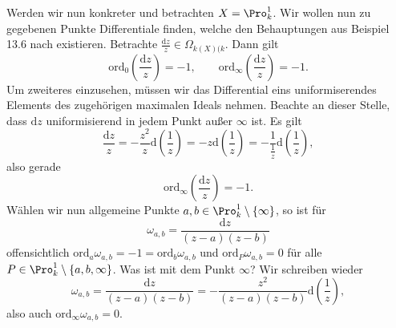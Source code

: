 \documentclass[11pt]{book}
\theoremstyle{nonumberbreak}
\newenvironment{pr}[1][]{\ifthenelse{\equal{#1}{}}{\proof}{\proof[#1]}\rm}{\endproof}
\newenvironment{ex}[1][]{\ifthenelse{\equal{#1}{}}{\example}{\example[#1]}\rm}{\endexample}
\begin{document}
\begin{spacing}{1.4}
\begin{ex}
\begin{pr}
\begin{compactenum}
\end{compactenum}
\end{pr}


\end{ex}


\begin{ex}
Werden wir nun konkreter und betrachten $X= \Pro^1_k$. Wir wollen nun zu gegebenen Punkte Differentiale finden, welche den Behauptungen aus Beispiel 13.6 nach existieren. Betrachte $\frac{\mathrm{d}z}{z} \in \Omega_{k(X)(k}$. Dann gilt 
$$\mathrm{ord}_0 \left(\frac{\mathrm{d}z}{z}\right) = -1, \qquad \mathrm{ord}_{\infty} \left(\frac{\mathrm{d}z}{z}\right) = -1.$$
Um zweiteres einzusehen, müssen wir das Differential eins uniformiserendes Elements des zugehörigen maximalen Ideals nehmen. Beachte an dieser Stelle, dass $\mathrm{d}z$ uniformisierend in jedem Punkt außer $\infty$ ist. Es gilt 
$$\frac{\mathrm{d}z}{z} = - \frac{z^2}{z} \mathrm{d}\left( \frac{1}{z}\right) = -z \mathrm{d}\left( \frac{1}{z}\right) = - \frac{1}{\frac{1}{z}} \mathrm{d}\left(\frac{1}{z}\right),$$
also gerade 
$$\mathrm{ord}_{\infty} \left(\frac{\mathrm{d}z}{z}\right) = -1.$$
Wählen wir nun allgemeine Punkte $a,b \in \Pro^{1}_k \setminus \{\infty\}$, so ist für
$$\omega_{a,b} = \frac{\mathrm{d}{z}}{(z-a)(z-b)}$$
offensichtlich $\mathrm{ord}_a \omega_{a,b} = -1 = \mathrm{ord}_b \omega_{a,b}$ und $\mathrm{ord}_P \omega_{a,b} = 0$ für alle $P \in \Pro^{1}_k \setminus \{a,b, \infty\}$. Was ist mit dem Punkt $\infty$? Wir schreiben wieder 
$$\omega_{a,b} = \frac{\mathrm{d}z}{(z-a)(z-b)} = - \frac{z^2}{(z-a)(z-b)} \mathrm{d}\left(\frac{1}{z}\right),$$
also auch $\mathrm{ord}_{\infty} \omega_{a,b}=0$. 

\end{ex}




\end{spacing}
\end{document}
